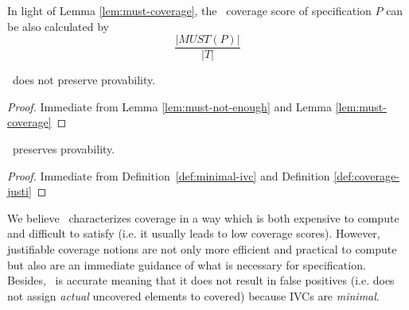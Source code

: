 In light of Lemma \ref{lem:must-coverage}, the \nondetcov\ coverage score of specification $P$ can be also calculated by
$$\frac{|MUST(P)|}{|T|}$$
\vspace{0.2in}


%
\begin{coroll}
\label{cor:must-not-provable}
\nondetcov\ does not preserve provability.
\end{coroll}
\begin{proof}
Immediate from Lemma \ref{lem:must-not-enough} and Lemma \ref{lem:must-coverage}
\end{proof}
\vspace{2mm}
\begin{coroll}
\label{cor:ivc-provable}
\ivccov\ preserves provability.
\end{coroll}
\begin{proof}
Immediate from Definition~\ref{def:minimal-ivc} and Definition \ref{def:coverage-justi}
\end{proof}
\vspace{2mm}
We believe \nondetcov\ characterizes coverage in a way which is both expensive to compute and difficult to satisfy (i.e. it usually leads to low coverage scores). However, justifiable coverage notions are not only more efficient and practical to compute but also are an immediate guidance of what is necessary for specification.
Besides, \ivccov\ is accurate meaning that it does not result in false positives (i.e. does not assign \emph{actual} uncovered elements to covered) because IVCs are \emph{minimal}.



